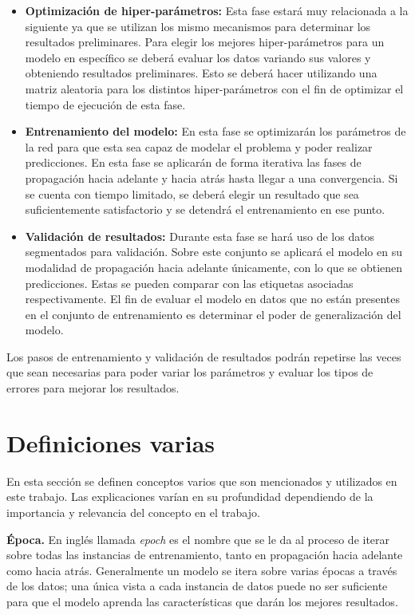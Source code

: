 \begin{itemize}
\item \textbf{Optimización de hiper-parámetros:} Esta fase estará muy relacionada a la siguiente ya que se utilizan los mismo mecanismos para determinar los resultados preliminares. Para elegir los mejores hiper-parámetros para un modelo en específico se deberá evaluar los datos variando sus valores y obteniendo resultados preliminares. Esto se deberá hacer utilizando una matriz aleatoria para los distintos hiper-parámetros con el fin de optimizar el tiempo de ejecución de esta fase.

\item \textbf{Entrenamiento del modelo:} En esta fase se optimizarán los parámetros de la red para que esta sea capaz de modelar el problema y poder realizar predicciones. En esta fase se aplicarán de forma iterativa las fases de propagación hacia adelante y hacia atrás hasta llegar a una convergencia. Si se cuenta con tiempo limitado, se deberá elegir un resultado que sea suficientemente satisfactorio y se detendrá el entrenamiento en ese punto.

\item \textbf{Validación de resultados:} Durante esta fase se hará uso de los datos segmentados para validación. Sobre este conjunto se aplicará el modelo en su modalidad de propagación hacia adelante únicamente, con lo que se obtienen predicciones. Estas se pueden comparar con las etiquetas asociadas respectivamente. El fin de evaluar el modelo en datos que no están presentes en el conjunto de entrenamiento es determinar el poder de generalización del modelo.

\end{itemize}

Los pasos de entrenamiento y validación de resultados podrán repetirse las veces que sean necesarias para poder variar los parámetros y evaluar los tipos de errores para mejorar los resultados.

\section{Definiciones varias}

En esta sección se definen conceptos varios que son mencionados y utilizados en este trabajo. Las explicaciones varían en su profundidad dependiendo de la importancia y relevancia del concepto en el trabajo.

\textbf{Época.} En inglés llamada \emph{epoch} es el nombre que se le da al proceso de iterar sobre todas las instancias de entrenamiento, tanto en propagación hacia adelante como hacia atrás. Generalmente un modelo se itera sobre varias épocas a través de los datos; una única vista a cada instancia de datos puede no ser suficiente para que el modelo aprenda las características que darán los mejores resultados.


